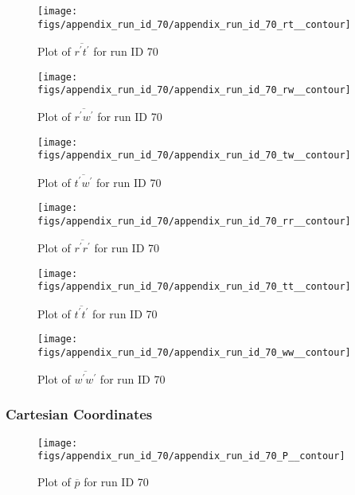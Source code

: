\begin{figure}[H]
\centering
\texttt{[image: figs/appendix\_run\_id\_70/appendix\_run\_id\_70\_rt\_\_contour]}
\caption{Plot of $\overline{r^\prime t^\prime}$ for run ID 70}
\label{fig:appendix_run_id_70_rt__contour}
\end{figure}


\begin{figure}[H]
\centering
\texttt{[image: figs/appendix\_run\_id\_70/appendix\_run\_id\_70\_rw\_\_contour]}
\caption{Plot of $\overline{r^\prime w^\prime}$ for run ID 70}
\label{fig:appendix_run_id_70_rw__contour}
\end{figure}


\begin{figure}[H]
\centering
\texttt{[image: figs/appendix\_run\_id\_70/appendix\_run\_id\_70\_tw\_\_contour]}
\caption{Plot of $\overline{t^\prime w^\prime}$ for run ID 70}
\label{fig:appendix_run_id_70_tw__contour}
\end{figure}


\begin{figure}[H]
\centering
\texttt{[image: figs/appendix\_run\_id\_70/appendix\_run\_id\_70\_rr\_\_contour]}
\caption{Plot of $\overline{r^\prime r^\prime}$ for run ID 70}
\label{fig:appendix_run_id_70_rr__contour}
\end{figure}


\begin{figure}[H]
\centering
\texttt{[image: figs/appendix\_run\_id\_70/appendix\_run\_id\_70\_tt\_\_contour]}
\caption{Plot of $\overline{t^\prime t^\prime}$ for run ID 70}
\label{fig:appendix_run_id_70_tt__contour}
\end{figure}


\begin{figure}[H]
\centering
\texttt{[image: figs/appendix\_run\_id\_70/appendix\_run\_id\_70\_ww\_\_contour]}
\caption{Plot of $\overline{w^\prime w^\prime}$ for run ID 70}
\label{fig:appendix_run_id_70_ww__contour}
\end{figure}


\subsubsection{Cartesian Coordinates}
\begin{figure}[H]
\centering
\texttt{[image: figs/appendix\_run\_id\_70/appendix\_run\_id\_70\_P\_\_contour]}
\caption{Plot of $\overline{p}$ for run ID 70}
\label{fig:appendix_run_id_70_P__contour}
\end{figure}


